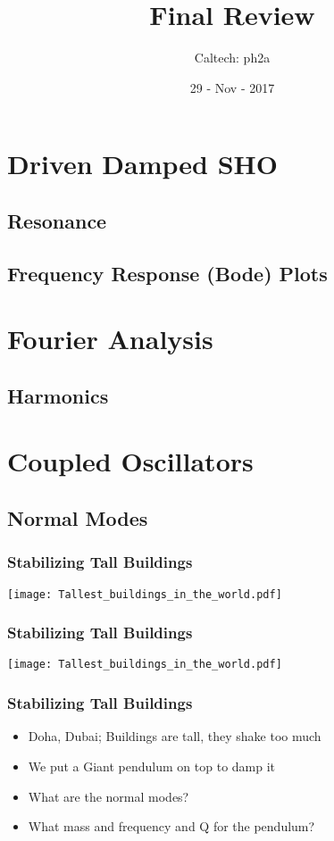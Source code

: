 \documentclass[pdf, handout, xcolor={usenames,dvipsnames,svgnames,table}, hideothersubsections]{beamer}
\begin{document}
\title{Final Review}
\author{Caltech: ph2a}
\date{29 - Nov - 2017}


\frame{\titlepage}




\section{Driven Damped SHO}
   \subsection{Resonance}
   \subsection{Frequency Response  (Bode) Plots}

\section{Fourier Analysis}
   \subsection{Harmonics}

\section{Coupled Oscillators}
   \subsection{Normal Modes}
\begin{frame}
\frametitle{Stabilizing Tall Buildings}

\centering
\texttt{[image: Tallest\_buildings\_in\_the\_world.pdf]}
\end{frame}

\begin{frame}
\frametitle{Stabilizing Tall Buildings}

\centering
\texttt{[image: Tallest\_buildings\_in\_the\_world.pdf]}
\end{frame}


\begin{frame}
\frametitle{Stabilizing Tall Buildings}
\begin{itemize}
\item Doha, Dubai; Buildings are tall, they shake too much
\item We put a Giant pendulum on top to damp it
\item What are the normal modes?
\item What mass and frequency and Q for the pendulum?
\end{itemize}
\end{frame}
\end{document}
